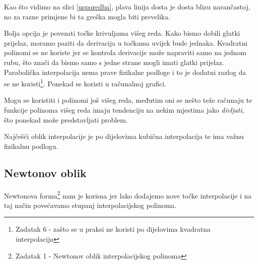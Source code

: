 \documentclass[12pt,a4paper]{report}
\begin{document}
	Kao što vidimo na slici \ref{usporedba}, plava linija dosta je dosta blizu narančastoj, no za razne primjene bi ta greška mogla biti prevelika.
	
	Bolja opcija je povezati točke krivuljama višeg reda. Kako bismo dobili glatki prijelaz, moramo paziti da derivacija u točkama uvijek bude jednaka. Kvadratni polinomi se ne koriste jer se kontrola derivacije može napraviti samo na jednom rubu, što znači da bismo samo s jedne strane mogli imati glatki prijelaz. Parabolička interpolacija nema prave fizikalne podloge i to je dodatni razlog da se ne koristi\footnote{Zadatak 6 - zašto se u praksi ne koristi po dijelovima kvadratna interpolacija}. Ponekad se koristi u računalnoj grafici.\cite{hari} 
	
	Mogu se koristiti i polinomi još višeg reda, međutim oni se nešto teže računaju te funkcije polinoma višeg reda imaju tendenciju na nekim mjestima jako \textit{divljati}, što ponekad može predstavljati problem\cite{ChEn2450}. 
	
	Najčešći oblik interpolacije je po dijelovima kubična interpolacija te ima važnu fizikalnu podlogu\cite{hari}.
	\subsection{Newtonov oblik \cite{hari}}
	Newtonova forma\footnote{Zadatak 1 - Newtonov oblik interpolacijskog polinoma} nam je korisna jer lako dodajemo nove točke interpolacije i na taj način povećavamo stupanj interpolacijskog polinoma. 
	
\end{document}
